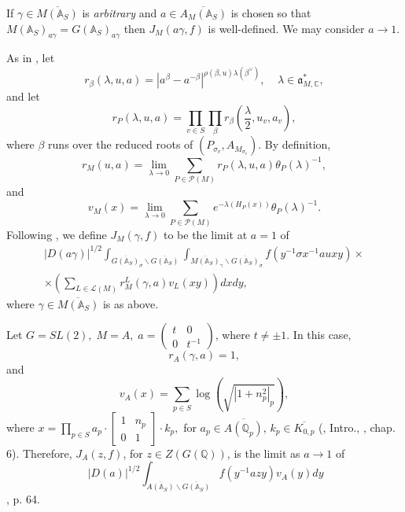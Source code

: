 If $\gamma \in \overline{M({\mathbb {A}}_S)}$
is {\em arbitrary} and $a\in \overline{A_M({\mathbb {A}}_S)}$ is
chosen so that
$M({\mathbb {A}}_S)_{a\gamma }=G({\mathbb {A}}_S)_{a\gamma }$
then $J_M(a\gamma ,f)$ is well-defined. We may consider
$a\rightarrow 1$.

As in \cite[\S 3]{A7}, let 
\[
r_\beta (\lambda ,u,a)
=|a^\beta -a^{-\beta }|^{\rho (\beta ,u)\lambda (\beta^{\vee })},
\;\;\;\;\lambda \in {\mathfrak {a}}_{M,{\mathbb {C}}}^{*}, 
\]
and let 
\[
r_P(\lambda ,u,a)
=\prod_{v\in S}\prod_\beta
r_\beta (\frac \lambda 2,u_v,a_v), 
\]
where $\beta $ runs over the reduced roots of
$(P_{\sigma _v},A_{M_{\sigma_v}})$. By definition, 
\[
r_M(u ,a)=\lim_{\lambda \rightarrow 0}
\sum_{P\in {\mathcal P}(M)}r_P(\lambda ,u,a)\theta _P(\lambda )^{-1}, 
\]
and 
\[
v_M(x)=\lim_{\lambda \rightarrow 0}
\sum_{P\in {\mathcal P}(M)}e^{-\lambda (H_P(x))}
\theta _P(\lambda )^{-1}. 
\]
Following \cite[(8.1)]{A7},
we define $J_M(\gamma ,f)$ to be the limit at $a=1$
of 
\begin{equation}\label{eq:4.20}
\begin{array}{c}
|D(a\gamma )|^{1/2}
\int_{\overline{G({\mathbb {A}}_S)}_\sigma \backslash
\overline{G({\mathbb {A}}_S)}}
\int_{\overline{M({\mathbb {A}}_S)}_\gamma
\backslash \overline{G({\mathbb {A}}_S)}_\sigma }
f(y^{-1}\sigma x^{-1}a u xy)\times \\
\times
\left( \sum_{L\in {\mathcal{L}}(M)}
r_M^L(\gamma ,a)v_L(xy)\right) dxdy,
\end{array}
\end{equation}
where $\gamma\in \overline{M({\mathbb A}_S)}$ is as above.
\begin{example}\label{ex:4.11}
Let $G=SL(2),\;M=A,\;a=\left( 
\begin{array}{cc}
t & 0 \\ 
0 & t^{-1}
\end{array}
\right) $, where $t\neq \pm 1$. In this case, 
\[
r_A(\gamma ,a)=1,
\]
and 
\[
v_A(x)=\sum_{p\in S}\log (\sqrt{|1+n_p^2|_p}),
\]
where $x=\prod_{p\in S}a_p\cdot \left[ 
\begin{array}{cc}
1 & n_p \\ 
0 & 1
\end{array}
\right] \cdot k_p,$ for
$a_p\in \overline{A({\mathbb {Q}}_p)}$, $k_p\in \overline{K_{0,p}}$
(\cite{A6}, Intro., \cite{Sho}, chap. 6). Therefore,
$J_A(z,f)$, for $z\in Z(G({\mathbb Q}))$,
is the limit as $a\rightarrow 1$ of 
\begin{equation}\label{eq:4.21}
\ |D(a)|^{1/2}
\int_{\overline{A({\mathbb {A}}_S)}\backslash \overline{G({\mathbb {A}}_S)}}
f(y^{-1} az y)v_A(y)dy 
\end{equation}
\cite[section 6.1]{Sho}, p. 64.
\end{example}

